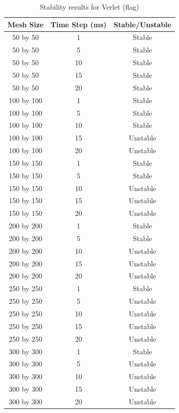 \begin{table}[tp]
   \begin{minipage}{\textwidth}
      \begin{center}
         \begin{tabular}{c|c|c}
           Mesh Size & Time Step (ms) & Stable/Unstable\\
           \hline
           50 by 50 & 1 & Stable\\
           50 by 50 & 5 & Stable\\
           50 by 50 & 10 & Stable\\
           50 by 50 & 15 & Stable\\
           50 by 50 & 20 & Stable\\
           100 by 100 & 1 & Stable\\
           100 by 100 & 5 & Stable\\
           100 by 100 & 10 & Stable\\
           100 by 100 & 15 & Unstable\\
           100 by 100 & 20 & Unstable\\           
           150 by 150 & 1 & Stable\\
           150 by 150 & 5 & Stable\\
           150 by 150 & 10 & Unstable\\
           150 by 150 & 15 & Unstable\\
           150 by 150 & 20 & Unstable\\           
           200 by 200 & 1 & Stable\\
           200 by 200 & 5 & Stable\\
           200 by 200 & 10 & Unstable\\
           200 by 200 & 15 & Unstable\\
           200 by 200 & 20 & Unstable\\           
           250 by 250 & 1 & Stable\\
           250 by 250 & 5 & Unstable\\
           250 by 250 & 10 & Unstable\\
           250 by 250 & 15 & Unstable\\
           250 by 250 & 20 & Unstable\\           
           300 by 300 & 1 & Stable\\
           300 by 300 & 5 & Unstable\\
           300 by 300 & 10 & Unstable\\
           300 by 300 & 15 & Unstable\\
           300 by 300 & 20 & Unstable\\
         \end{tabular}
      \end{center}
   \end{minipage}
   \caption{Stability results for Verlet (flag)}
   \label{tab:v stability flag}
\end{table}

